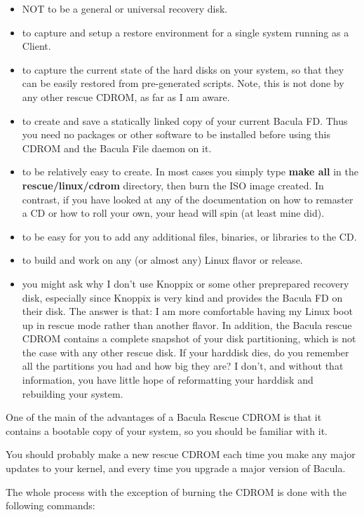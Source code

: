 \begin{itemize}
\item NOT to be a general or universal recovery disk. 
\item to capture and setup a restore environment for a  single system running
   as a Client. 
\item to capture the current state of the hard disks on your system, so that
   they can be easily restored from pre-generated  scripts. Note, this is
   not done by any other rescue CDROM, as far as I am aware.
\item to create and save a statically linked copy of your  current Bacula FD. 
   Thus you need no packages or other software to be installed before using
   this CDROM and the Bacula File daemon on it.
\item to be relatively easy to create. In most cases  you simply type {\bf
   make all} in the {\bf rescue/linux/cdrom}  directory, then burn the ISO image
   created. In contrast,  if you have looked at  any of the documentation on how
   to remaster a CD or how to roll your  own, your head will spin (at least mine
   did). 
\item to be easy for you to add any additional files, binaries,  or libraries
   to the CD. 
\item to build and work on any (or almost any) Linux  flavor or release. 
\item you might ask why I don't use Knoppix or some other preprepared recovery
   disk, especially since Knoppix is very kind and provides the Bacula FD on
   their disk.  The answer is that: I am more comfortable having my Linux boot
   up in rescue mode rather than another flavor. In addition, the Bacula rescue
   CDROM contains a complete snapshot of your disk partitioning, which is not
   the case with any other rescue disk. If your harddisk dies, do you remember all
   the partitions you had and how big they are?  I don't, and without that information,
   you have little hope of reformatting your harddisk and rebuilding your system.
\end{itemize}

One of the main of the advantages of a Bacula Rescue CDROM is that it contains
a bootable copy of your system, so you should be familiar with it. 

You should probably make a new rescue CDROM each time you make any major
updates to your kernel, and every time you upgrade a major version of Bacula. 

The whole process with the exception of burning the CDROM is done with the
following commands: 

